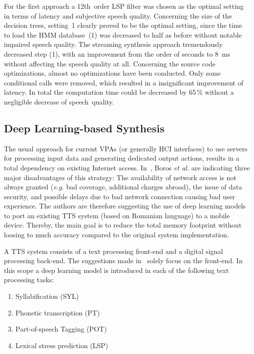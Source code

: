For the first approach a 12th~order \ac{LSP} filter was chosen as the optimal setting in terms of latency and subjective speech quality. Concerning the size of the decision trees, setting~1 clearly proved to be the optimal setting, since the time to load the \ac{HMM} database~(1) was decreased to half as before without notable impaired speech quality. The streaming synthesis approach tremendously decreased step (1), with an improvement from the order of seconds to 8~ms without affecting the speech quality at all. Concerning the source code optimizations, almost no optimizations have been conducted. Only some conditional calls were removed, which resulted in a insignificant improvement of latency. In total the computation time could be decreased by 65\,\% without a negligible decrease of speech~quality.

\subsection{Deep Learning-based Synthesis}
\label{subsec:deepembedded}

The usual approach for current \acfp{VPA} (or generally \ac{HCI} interfaces) to use servers for processing input data and generating dedicated output actions, results in a total dependency on existing Internet access. In~\cite{boros:robust}, Boros \textit{et al.} are indicating three major disadvantages of this strategy: The availability of network access is not always granted (\textit{e.g.} bad coverage, additional charges abroad), the issue of data security, and possible delays due to bad network connection causing bad user experience. The authors are therefore suggesting the use of deep learning models to port an existing \ac{TTS} system (based on Romanian language) to a mobile device. Thereby, the main goal is to reduce the total memory footprint without loosing to much accuracy compared to the original system implementation.

A \ac{TTS} system consists of a text processing front-end and a digital signal processing back-end. The suggestions made in~\cite{boros:robust} solely focus on the front-end. In this scope a deep learning model is introduced in each of the following text processing tasks:

\begin{enumerate}[label=\arabic*.]		%
	\parskip0.25em
	\bfseries
	\item Syllabification (SYL)
	\item Phonetic transcription (PT)
	\item Part-of-speech Tagging (POT)
	\item Lexical stress prediction (LSP)
\end{enumerate}

